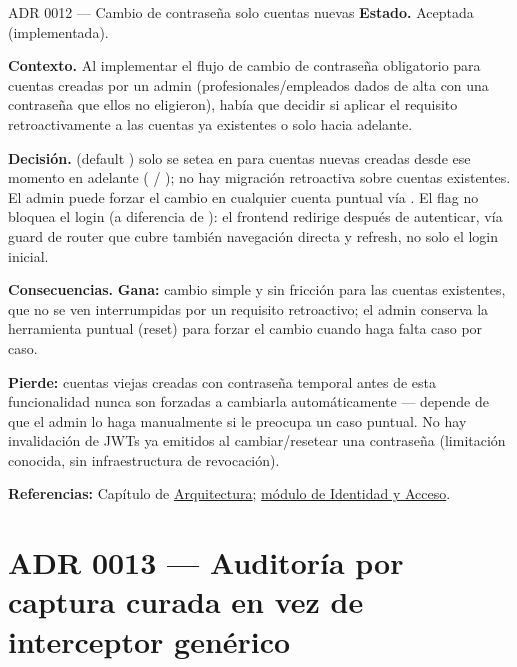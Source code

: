 \begin{cajaADR}{ADR 0012 --- Cambio de contraseña solo cuentas nuevas}
\textbf{Estado.} Aceptada (implementada).

\textbf{Contexto.} Al implementar el flujo de cambio de contraseña obligatorio para cuentas creadas por un admin (profesionales/empleados dados de alta con una contraseña que ellos no eligieron), había que decidir si aplicar el requisito retroactivamente a las cuentas ya existentes o solo hacia adelante.

\textbf{Decisión.} \allowbreak {} (default ) solo se setea en  para cuentas nuevas creadas desde ese momento en adelante (\allowbreak {} / \allowbreak {}); no hay migración retroactiva sobre cuentas existentes. El admin puede forzar el cambio en cualquier cuenta puntual vía \allowbreak {}. El flag no bloquea el login (a diferencia de ): el frontend redirige después de autenticar, vía guard de router que cubre también navegación directa y refresh, no solo el login inicial.

\textbf{Consecuencias.} \textbf{Gana:} cambio simple y sin fricción para las cuentas existentes, que no se ven interrumpidas por un requisito retroactivo; el admin conserva la herramienta puntual (reset) para forzar el cambio cuando haga falta caso por caso.

\textbf{Pierde:} cuentas viejas creadas con contraseña temporal antes de esta funcionalidad nunca son forzadas a cambiarla automáticamente --- depende de que el admin lo haga manualmente si le preocupa un caso puntual. No hay invalidación de JWTs ya emitidos al cambiar/resetear una contraseña (limitación conocida, sin infraestructura de revocación).
\end{cajaADR}

\textbf{Referencias:} Capítulo de \hyperref[sec:arch]{Arquitectura}; \hyperref[mod:01-identidad-y-acceso]{módulo de Identidad y Acceso}.

\section{ADR 0013 --- Auditoría por captura curada en vez de interceptor genérico}
\label{adr:0013}

